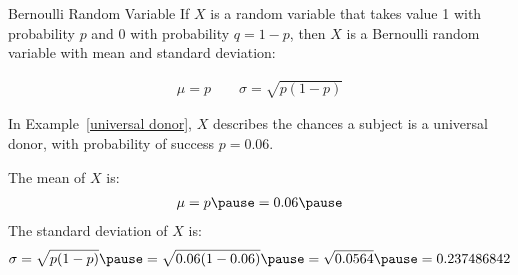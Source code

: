 \documentclass{beamer}
\begin{document}
\begin{frame}
  \begin{block}{Bernoulli Random Variable}
    If $X$ is a random variable that takes value 1 with probability $p$ and 0 with probability $q=1-p$, then $X$ is a Bernoulli random variable with mean and standard deviation:

    \vspace{-4mm}
    \begin{equation*}
      \begin{aligned}
        \mu=p
        \qquad
        \sigma=\sqrt{p(1-p)}
      \end{aligned}
    \end{equation*}
  \end{block}\pause

  \begin{example}
    In Example~\ref{universal donor}, $X$ describes the chances a subject is a universal donor, with probability of success $p=0.06$.\pause

    \vspace{1mm}
    The mean of $X$ is:
    \begin{equation*}
      \begin{aligned}
        \mu=p\pause
        =0.06\pause
      \end{aligned}
    \end{equation*}
    The standard deviation of $X$ is:
    \begin{equation*}
      \begin{aligned}
        \sigma = \sqrt{p(1-p)}\pause
        =\sqrt{0.06(1-0.06)}\pause
        =\sqrt{0.0564}\pause
        =0.237486842
      \end{aligned}
    \end{equation*}
  \end{example}
\end{frame}
\end{document}
